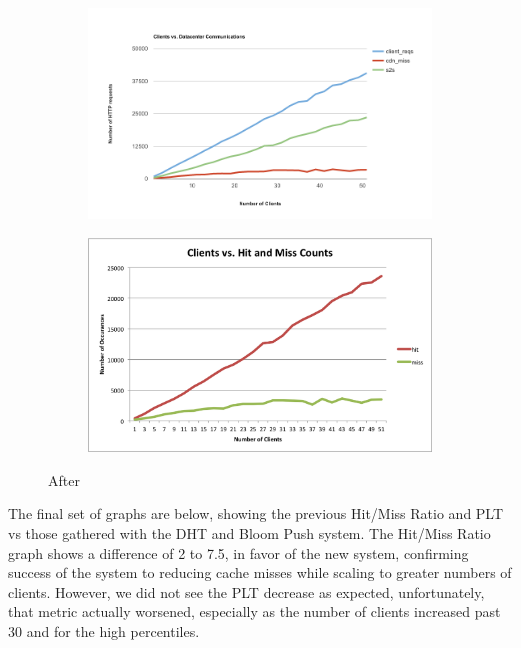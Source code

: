 \documentclass[conference]{IEEEtran}
\begin{document}
\begin{figure}[!h]
	\centering
	\begin{subfigure}[b]{0.49\columnwidth}
		\centering
		\includegraphics[width=\columnwidth]{figures/client-server_1.png}
	\end{subfigure}
	\begin{subfigure}[b]{0.49\columnwidth}
		\centering
		\includegraphics[width=\columnwidth]{figures/hit_miss_separate_1.png}
	\end{subfigure}
	\caption{After}
\end{figure}

The final set of graphs are below, showing the previous Hit/Miss Ratio and PLT vs those gathered with the DHT and Bloom Push system. The Hit/Miss Ratio graph shows a difference of 2 to 7.5, in favor of the new system, confirming success of the system to reducing cache misses while scaling to greater numbers of clients. However, we did not see the PLT decrease as expected, unfortunately, that metric actually worsened, especially as the number of clients increased past 30 and for the high percentiles.
\end{document}
